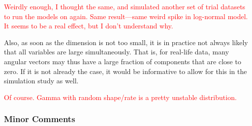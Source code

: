 \documentclass[10pt]{article}
\newcommand{\peter}[1]{\textcolor{red}{#1}}  %
\begin{document}
\peter{Weirdly enough, I thought the same, and simulated another set of trial datasets to run the models on again.  Same result---same weird spike in log-normal model.  It seems to be a real effect, but I don't understand why.}

Also, as soon as the dimension is not too small, it is in practice not always likely that all variables are large simultaneously. That is, for real-life data, many angular vectors may thus have a large fraction of components that are close to zero. If it is not already the case, it would be informative to allow for this in the simulation study as well.

\peter{Of course.   Gamma with random shape/rate is a pretty unstable distribution.}

\subsubsection*{Minor Comments}
\end{document}
